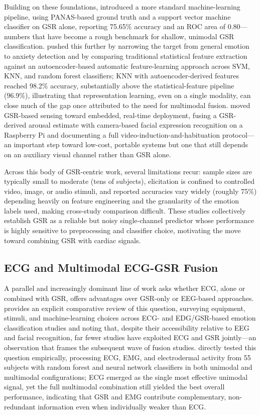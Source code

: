 Building on these foundations, \cite{setyohadi2018galvanic} introduced a more standard machine-learning pipeline, using PANAS-based ground truth and a support vector machine classifier on GSR alone, reporting 75.65\% accuracy and an ROC area of 0.80---numbers that have become a rough benchmark for shallow, unimodal GSR classification. \cite{alnafjan2024anxiety} pushed this further by narrowing the target from general emotion to anxiety detection and by comparing traditional statistical feature extraction against an autoencoder-based automatic feature-learning approach across SVM, KNN, and random forest classifiers; KNN with autoencoder-derived features reached 98.2\% accuracy, substantially above the statistical-feature pipeline (96.9\%), illustrating that representation learning, even on a single modality, can close much of the gap once attributed to the need for multimodal fusion. \cite{patil2023face} moved GSR-based sensing toward embedded, real-time deployment, fusing a GSR-derived arousal estimate with camera-based facial expression recognition on a Raspberry Pi and documenting a full video-induction-and-habituation protocol---an important step toward low-cost, portable systems but one that still depends on an auxiliary visual channel rather than GSR alone.

Across this body of GSR-centric work, several limitations recur: sample sizes are typically small to moderate (tens of subjects), elicitation is confined to controlled video, image, or audio stimuli, and reported accuracies vary widely (roughly 75\%) depending heavily on feature engineering and the granularity of the emotion labels used, making cross-study comparison difficult. These studies collectively establish GSR as a reliable but noisy single-channel predictor whose performance is highly sensitive to preprocessing and classifier choice, motivating the move toward combining GSR with cardiac signals.

\subsection{ECG and Multimodal ECG-GSR Fusion}
A parallel and increasingly dominant line of work asks whether ECG, alone or combined with GSR, offers advantages over GSR-only or EEG-based approaches. \cite{bulagang2020review} provides an explicit comparative review of this question, surveying equipment, stimuli, and machine-learning choices across ECG- and EDG/GSR-based emotion classification studies and noting that, despite their accessibility relative to EEG and facial recognition, far fewer studies have exploited ECG and GSR jointly---an observation that frames the subsequent wave of fusion studies. \cite{pinto2020multimodal} directly tested this question empirically, processing ECG, EMG, and electrodermal activity from 55 subjects with random forest and neural network classifiers in both unimodal and multimodal configurations; ECG emerged as the single most effective unimodal signal, yet the full multimodal combination still yielded the best overall performance, indicating that GSR and EMG contribute complementary, non-redundant information even when individually weaker than ECG.

